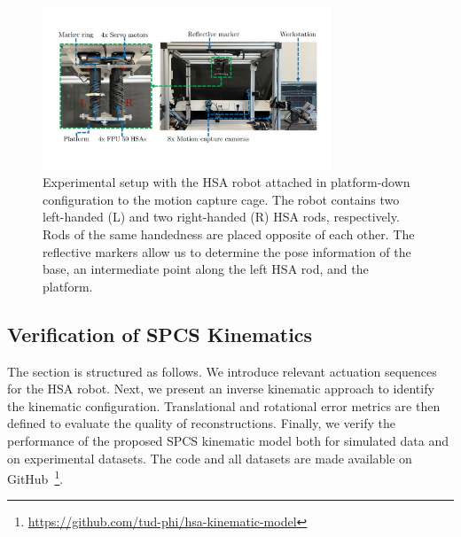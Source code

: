 
\begin{figure}
    \centering
    \includegraphics[width=0.77\textwidth]{hsamodel/figures/experimental_setup/experimental_setup_v3_compressed.pdf}
    \caption{Experimental setup with the \gls{HSA} robot attached in platform-down configuration to the motion capture cage. The robot contains two left-handed (L) and two right-handed (R) \gls{HSA} rods, respectively. Rods of the same handedness are placed opposite of each other. The reflective markers allow us to determine the pose information of the base, an intermediate point along the left \gls{HSA} rod, and the platform.}\label{fig:hsamodel:experimental_setup}
\end{figure}



\subsection{Verification of SPCS Kinematics}\label{sub:hsamodel:hsa_rod_kinematics:verification}
The section is structured as follows. We introduce relevant actuation sequences for the \gls{HSA} robot.
Next, we present an inverse kinematic approach to identify the kinematic configuration.
Translational and rotational error metrics are then defined to evaluate the quality of reconstructions. %
Finally, we verify the performance of the proposed \gls{SPCS} kinematic model both for simulated data and on experimental datasets.
The code and all datasets are made available on GitHub~\footnote{\url{https://github.com/tud-phi/hsa-kinematic-model}}.

